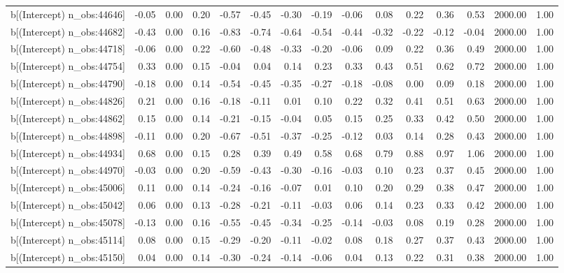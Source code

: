 \begin{table}[ht]
\begin{tabular}{rrrrrrrrrrrrrrr}
  b[(Intercept) n\_obs:44646] & -0.05 & 0.00 & 0.20 & -0.57 & -0.45 & -0.30 & -0.19 & -0.06 & 0.08 & 0.22 & 0.36 & 0.53 & 2000.00 & 1.00 \\ 
  b[(Intercept) n\_obs:44682] & -0.43 & 0.00 & 0.16 & -0.83 & -0.74 & -0.64 & -0.54 & -0.44 & -0.32 & -0.22 & -0.12 & -0.04 & 2000.00 & 1.00 \\ 
  b[(Intercept) n\_obs:44718] & -0.06 & 0.00 & 0.22 & -0.60 & -0.48 & -0.33 & -0.20 & -0.06 & 0.09 & 0.22 & 0.36 & 0.49 & 2000.00 & 1.00 \\ 
  b[(Intercept) n\_obs:44754] & 0.33 & 0.00 & 0.15 & -0.04 & 0.04 & 0.14 & 0.23 & 0.33 & 0.43 & 0.51 & 0.62 & 0.72 & 2000.00 & 1.00 \\ 
  b[(Intercept) n\_obs:44790] & -0.18 & 0.00 & 0.14 & -0.54 & -0.45 & -0.35 & -0.27 & -0.18 & -0.08 & 0.00 & 0.09 & 0.18 & 2000.00 & 1.00 \\ 
  b[(Intercept) n\_obs:44826] & 0.21 & 0.00 & 0.16 & -0.18 & -0.11 & 0.01 & 0.10 & 0.22 & 0.32 & 0.41 & 0.51 & 0.63 & 2000.00 & 1.00 \\ 
  b[(Intercept) n\_obs:44862] & 0.15 & 0.00 & 0.14 & -0.21 & -0.15 & -0.04 & 0.05 & 0.15 & 0.25 & 0.33 & 0.42 & 0.50 & 2000.00 & 1.00 \\ 
  b[(Intercept) n\_obs:44898] & -0.11 & 0.00 & 0.20 & -0.67 & -0.51 & -0.37 & -0.25 & -0.12 & 0.03 & 0.14 & 0.28 & 0.43 & 2000.00 & 1.00 \\ 
  b[(Intercept) n\_obs:44934] & 0.68 & 0.00 & 0.15 & 0.28 & 0.39 & 0.49 & 0.58 & 0.68 & 0.79 & 0.88 & 0.97 & 1.06 & 2000.00 & 1.00 \\ 
  b[(Intercept) n\_obs:44970] & -0.03 & 0.00 & 0.20 & -0.59 & -0.43 & -0.30 & -0.16 & -0.03 & 0.10 & 0.23 & 0.37 & 0.45 & 2000.00 & 1.00 \\ 
  b[(Intercept) n\_obs:45006] & 0.11 & 0.00 & 0.14 & -0.24 & -0.16 & -0.07 & 0.01 & 0.10 & 0.20 & 0.29 & 0.38 & 0.47 & 2000.00 & 1.00 \\ 
  b[(Intercept) n\_obs:45042] & 0.06 & 0.00 & 0.13 & -0.28 & -0.21 & -0.11 & -0.03 & 0.06 & 0.14 & 0.23 & 0.33 & 0.42 & 2000.00 & 1.00 \\ 
  b[(Intercept) n\_obs:45078] & -0.13 & 0.00 & 0.16 & -0.55 & -0.45 & -0.34 & -0.25 & -0.14 & -0.03 & 0.08 & 0.19 & 0.28 & 2000.00 & 1.00 \\ 
  b[(Intercept) n\_obs:45114] & 0.08 & 0.00 & 0.15 & -0.29 & -0.20 & -0.11 & -0.02 & 0.08 & 0.18 & 0.27 & 0.37 & 0.43 & 2000.00 & 1.00 \\ 
  b[(Intercept) n\_obs:45150] & 0.04 & 0.00 & 0.14 & -0.30 & -0.24 & -0.14 & -0.06 & 0.04 & 0.13 & 0.22 & 0.31 & 0.38 & 2000.00 & 1.00 \\ 

\end{tabular}
\end{table}
